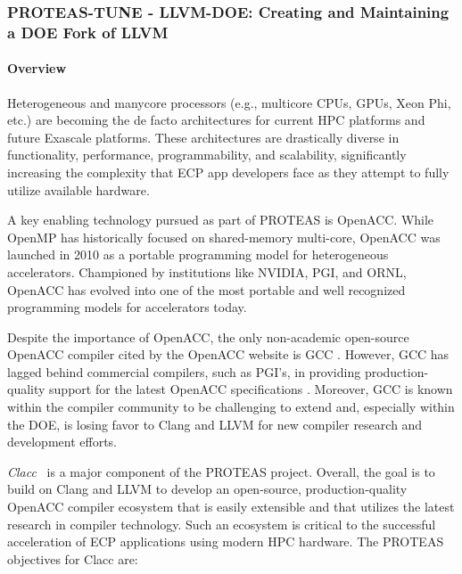 \subsubsection{ PROTEAS-TUNE - LLVM-DOE: Creating and Maintaining a DOE Fork of LLVM}\label{s:llvm-doe}



\paragraph{Overview}

Heterogeneous and manycore processors (e.g., multicore CPUs, GPUs,
Xeon Phi, etc.) are becoming the de facto architectures for current
HPC platforms and future Exascale platforms.  These architectures are
drastically diverse in functionality, performance, programmability,
and scalability, significantly increasing the complexity that ECP app
developers face as they attempt to fully utilize available hardware.

A key enabling technology pursued as part of PROTEAS is OpenACC.
While OpenMP has historically focused on shared-memory multi-core,
OpenACC was launched in 2010 as a portable programming model for
heterogeneous accelerators.  Championed by institutions like NVIDIA,
PGI, and ORNL, OpenACC has evolved into one of the most portable and
well recognized programming models for accelerators today.

Despite the importance of OpenACC, the only non-academic open-source OpenACC
compiler cited by the OpenACC website is GCC \cite{openaccOrgTools}.
However, GCC has lagged behind commercial compilers, such as PGI's, in
providing production-quality support for the latest OpenACC specifications
\cite{openACCValidationSuite}.  Moreover, GCC is known within the compiler
community to be challenging to extend and, especially within the DOE, is
losing favor to Clang and LLVM for new compiler research and development
efforts.

\textit{Clacc}~\cite{clacc:2018:denny} is a major component of the
PROTEAS project.  Overall, the goal is to build on Clang and LLVM to
develop an open-source, production-quality OpenACC compiler ecosystem
that is easily extensible and that utilizes the latest research in
compiler technology.  Such an ecosystem is critical to the successful
acceleration of ECP applications using modern HPC hardware.  The
PROTEAS objectives for Clacc are:

